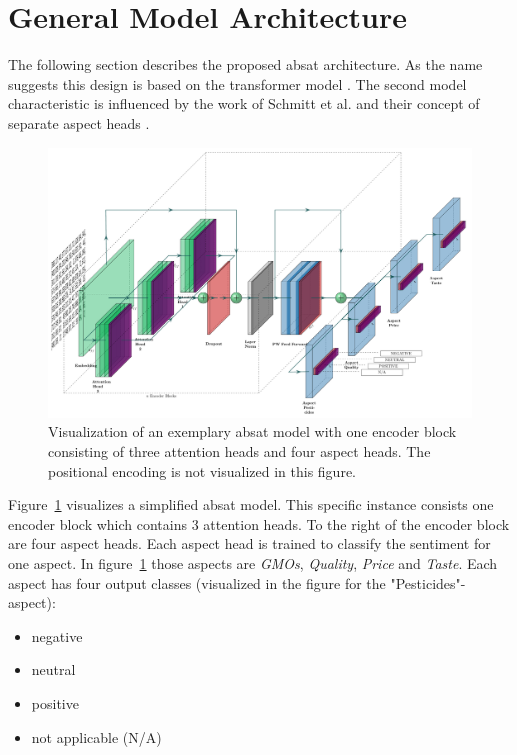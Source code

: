 \section{General Model Architecture}

The following section describes the proposed \acrfull{absat} architecture. As the name suggests this design is based on the transformer model \cite{Vaswani2017}. The second model characteristic is influenced by the work of Schmitt et al. and their concept of separate aspect heads \cite{Schmitt2018}.
\bigskip

\begin{figure}[htp]
	\centering
	\includegraphics[width=\textwidth]{figures/04_method/04_t-absa}
	\caption{Visualization of an exemplary \acrfull{absat} model with one encoder block consisting of three attention heads and four aspect heads. The positional encoding is not visualized in this figure.}
	\label{fig:04_t-absa}
\end{figure}

Figure~\ref{fig:04_t-absa} visualizes a simplified \gls{absat} model. This specific instance consists one encoder block which contains 3 attention heads. To the right of the encoder block are four aspect heads. Each aspect head is trained to classify the sentiment for one aspect. In figure~\ref{fig:04_t-absa} those aspects are \textit{GMOs}, \textit{Quality}, \textit{Price} and \textit{Taste}. Each aspect has four output classes {(visualized in the figure for the "Pesticides"-aspect)}:

\begin{itemize}
	\item negative
	\item neutral
	\item positive
	\item not applicable {(N/A)}
\end{itemize}

